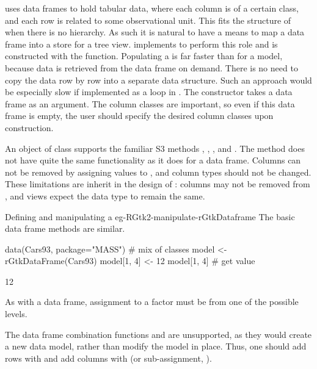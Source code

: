 \R\/ uses data frames to hold tabular data, where each column is of a
certain class, and each row is related to some observational
unit. This fits the structure of  when there is no
hierarchy. As such it is natural to have a means to map a data frame
into a store for a tree view.  implements
 to perform this role and is constructed with the
 function. Populating a
 is far faster than for a \GTK\/ model, because
data is retrieved from the data frame on demand. There is no need to
copy the data row by row into a separate data structure. Such an
approach would be especially slow if implemented as a loop in \R. The
constructor takes a data frame as an argument. The column classes are
important, so even if this data frame is empty, the user should
specify the desired column classes upon construction.

An object of class  supports the familiar S3
methods \method{[}{RGtkDataFrame}, \method{[\ASSIGN}{RGtkDataFrame},
, and
. The \code{[$<$-} method does
not have quite the same functionality as it does for a data
frame. Columns can not be removed by assigning values to ,
and column types should not be changed. These limitations are inherit
in the design of \GTK: columns may not be removed from
, and views expect the data type to remain the
same.

\begin{example}{Defining and manipulating a }{eg-RGtk2-manipulate-rGtkDataframe}
  The basic data frame methods are similar.
\begin{Schunk}
\begin{Sinput}
 data(Cars93, package="MASS")             # mix of classes
 model <- rGtkDataFrame(Cars93)
 model[1, 4] <- 12
 model[1, 4]                              # get value
\end{Sinput}
\begin{Soutput}
[1] 12
\end{Soutput}
\end{Schunk}
%
As with a data frame, assignment to a factor must be from one of the
possible levels.

\end{example}

The data frame combination functions  and
 are unsupported, as they would create a new data
model, rather than modify the model in place. Thus, one should add
rows with  and add columns with
 (or sub-assignment, 
\method{[\ASSIGN}{RGtkDataFrame}).

